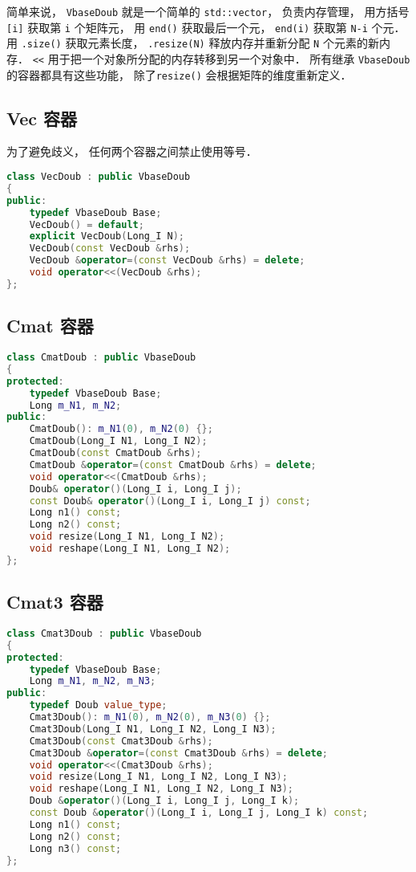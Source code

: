 简单来说， \verb|VbaseDoub| 就是一个简单的 \verb|std::vector|， 负责内存管理， 用方括号 \verb|[i]| 获取第 \verb|i| 个矩阵元， 用 \verb|end()| 获取最后一个元， \verb|end(i)| 获取第 \verb|N-i| 个元． 用 \verb|.size()| 获取元素长度， \verb|.resize(N)| 释放内存并重新分配 \verb|N| 个元素的新内存． \verb|<<| 用于把一个对象所分配的内存转移到另一个对象中． 所有继承 \verb|VbaseDoub| 的容器都具有这些功能， 除了\verb|resize()| 会根据矩阵的维度重新定义．

\subsection{Vec 容器}
为了避免歧义， 任何两个容器之间禁止使用等号．
\begin{lstlisting}[language=cpp]
class VecDoub : public VbaseDoub
{
public:
    typedef VbaseDoub Base;
    VecDoub() = default;
    explicit VecDoub(Long_I N);
    VecDoub(const VecDoub &rhs);
    VecDoub &operator=(const VecDoub &rhs) = delete;
    void operator<<(VecDoub &rhs);
};
\end{lstlisting}

\subsection{Cmat 容器}
\begin{lstlisting}[language=cpp]
class CmatDoub : public VbaseDoub
{
protected:
    typedef VbaseDoub Base;
    Long m_N1, m_N2;
public:
    CmatDoub(): m_N1(0), m_N2(0) {};
    CmatDoub(Long_I N1, Long_I N2);
    CmatDoub(const CmatDoub &rhs);
    CmatDoub &operator=(const CmatDoub &rhs) = delete;
    void operator<<(CmatDoub &rhs);
    Doub& operator()(Long_I i, Long_I j);
    const Doub& operator()(Long_I i, Long_I j) const;
    Long n1() const;
    Long n2() const;
    void resize(Long_I N1, Long_I N2);
    void reshape(Long_I N1, Long_I N2);
};
\end{lstlisting}

\subsection{Cmat3 容器}
\begin{lstlisting}[language=cpp]
class Cmat3Doub : public VbaseDoub
{
protected:
    typedef VbaseDoub Base;
    Long m_N1, m_N2, m_N3;
public:
    typedef Doub value_type;
    Cmat3Doub(): m_N1(0), m_N2(0), m_N3(0) {};
    Cmat3Doub(Long_I N1, Long_I N2, Long_I N3);
    Cmat3Doub(const Cmat3Doub &rhs);
    Cmat3Doub &operator=(const Cmat3Doub &rhs) = delete;
    void operator<<(Cmat3Doub &rhs);
    void resize(Long_I N1, Long_I N2, Long_I N3);
    void reshape(Long_I N1, Long_I N2, Long_I N3);
    Doub &operator()(Long_I i, Long_I j, Long_I k);
    const Doub &operator()(Long_I i, Long_I j, Long_I k) const;
    Long n1() const;
    Long n2() const;
    Long n3() const;
};
\end{lstlisting}

